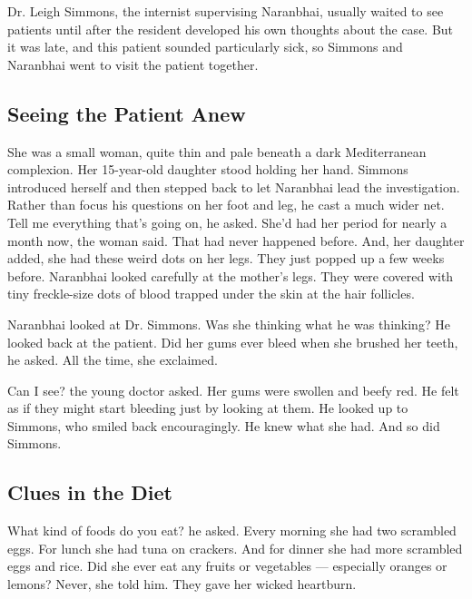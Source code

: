 Dr. Leigh Simmons, the internist supervising Naranbhai, usually waited
to see patients until after the resident developed his own thoughts
about the case. But it was late, and this patient sounded particularly
sick, so Simmons and Naranbhai went to visit the patient together.

\hypertarget{seeing-the-patient-anew}{%
\subsection{\texorpdfstring{\textbf{Seeing the Patient
Anew}}{Seeing the Patient Anew}}\label{seeing-the-patient-anew}}

She was a small woman, quite thin and pale beneath a dark Mediterranean
complexion. Her 15-year-old daughter stood holding her hand. Simmons
introduced herself and then stepped back to let Naranbhai lead the
investigation. Rather than focus his questions on her foot and leg, he
cast a much wider net. Tell me everything that's going on, he asked.
She'd had her period for nearly a month now, the woman said. That had
never happened before. And, her daughter added, she had these weird dots
on her legs. They just popped up a few weeks before. Naranbhai looked
carefully at the mother's legs. They were covered with tiny freckle-size
dots of blood trapped under the skin at the hair follicles.

Naranbhai looked at Dr. Simmons. Was she thinking what he was thinking?
He looked back at the patient. Did her gums ever bleed when she brushed
her teeth, he asked. All the time, she exclaimed.

Can I see? the young doctor asked. Her gums were swollen and beefy red.
He felt as if they might start bleeding just by looking at them. He
looked up to Simmons, who smiled back encouragingly. He knew what she
had. And so did Simmons.

\hypertarget{clues-in-the-diet}{%
\subsection{\texorpdfstring{\textbf{Clues in the
Diet}}{Clues in the Diet}}\label{clues-in-the-diet}}

What kind of foods do you eat? he asked. Every morning she had two
scrambled eggs. For lunch she had tuna on crackers. And for dinner she
had more scrambled eggs and rice. Did she ever eat any fruits or
vegetables --- especially oranges or lemons? Never, she told him. They
gave her wicked heartburn.

